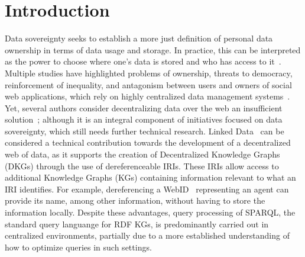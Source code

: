 \section{Introduction}

Data sovereignty seeks to establish a more just definition of personal data ownership in terms of data usage and storage.
In practice, this can be interpreted as the power to choose where one's data is stored and who has access to it~\cite{verstraete2022solid}.
Multiple studies have highlighted problems of ownership, threats to democracy, reinforcement of inequality, and antagonism between users and owners of social web applications, which rely on highly centralized data management systems~\cite{Terranova2000FreeLP, Curran2016ch1, Sevignani2013, 9663788}.
Yet, several authors consider decentralizing data over the web an insufficient solution~\cite{9663788, Curran2016ch1}; although it is an integral component of initiatives focused on data sovereignty,
which still needs further technical research.
Linked Data~\cite{heath2011} can be considered a technical contribution towards the development of a decentralized web of data,
as it supports the creation of Decentralized Knowledge Graphs (DKGs) through the use of dereferenceable IRIs.
These IRIs allow access to additional Knowledge Graphs (KGs) containing information relevant to what an IRI identifies.
For example, dereferencing a WebID~ representing an agent can provide its name, among other information, without having to store the information locally.
Despite these advantages, query processing of SPARQL, the standard query languange for RDF KGs, is predominantly carried out in centralized environments, partially due to a more established understanding of how to optimize queries in such settings.

